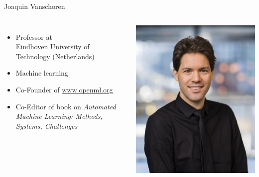 \begin{frame}[c]{Joaquin Vanschoren}



\begin{columns}
	
	
	\begin{itemize}
		\item Professor at\\ Eindhoven University of Technology (Netherlands)
		\item Machine learning 
		\item Co-Founder of \url{www.openml.org}
    	\item Co-Editor of book on \textit{Automated Machine Learning:	Methods, Systems, Challenges}
	\end{itemize}
	
	
	\includegraphics[width=1.0\textwidth]{images/vanschoren.jpg}
	
\end{columns}


\end{frame}
